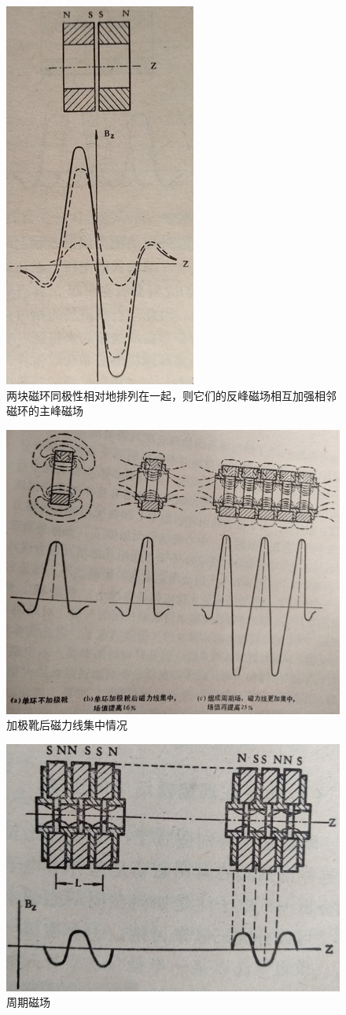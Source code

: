 \begin{figure}[phtb]
	\centering
	\includegraphics[width=0.37\linewidth]{figure/ch7-16}
	\caption{两块磁环同极性相对地排列在一起，则它们的反峰磁场相互加强相邻磁环的主峰磁场}
	\label{ch7-16}
\end{figure}

\begin{figure}[phtb]
	\centering
	\includegraphics[width=0.65\linewidth]{figure/ch7-17}
	\caption{加极靴后磁力线集中情况}
	\label{ch7-17}
\end{figure}

\begin{figure}[phtb]
	\centering
	\includegraphics[width=0.5\linewidth]{figure/ch7-18}
	\caption{周期磁场}
	\label{ch7-18}
\end{figure}


